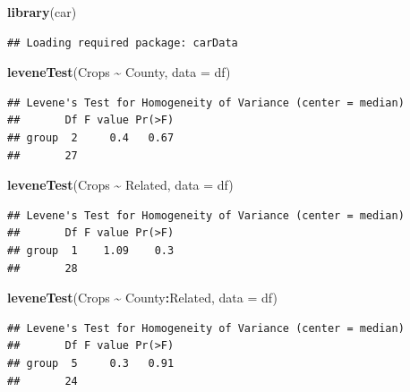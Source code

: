 \documentclass[
]{article}
\newenvironment{Shaded}{\begin{snugshade}}{\end{snugshade}}
\newcommand{\AttributeTok}[1]{\textcolor[rgb]{0.13,0.29,0.53}{#1}}
\newcommand{\FunctionTok}[1]{\textcolor[rgb]{0.13,0.29,0.53}{\textbf{#1}}}
\newcommand{\NormalTok}[1]{#1}
\newcommand{\SpecialCharTok}[1]{\textcolor[rgb]{0.81,0.36,0.00}{\textbf{#1}}}
\begin{document}
\begin{Shaded}
\begin{Highlighting}[]
\FunctionTok{library}\NormalTok{(car)}
\end{Highlighting}
\end{Shaded}

\begin{verbatim}
## Loading required package: carData
\end{verbatim}

\begin{Shaded}
\begin{Highlighting}[]
\FunctionTok{leveneTest}\NormalTok{(Crops }\SpecialCharTok{\textasciitilde{}}\NormalTok{ County, }\AttributeTok{data =}\NormalTok{ df)}
\end{Highlighting}
\end{Shaded}

\begin{verbatim}
## Levene's Test for Homogeneity of Variance (center = median)
##       Df F value Pr(>F)
## group  2     0.4   0.67
##       27
\end{verbatim}

\begin{Shaded}
\begin{Highlighting}[]
\FunctionTok{leveneTest}\NormalTok{(Crops }\SpecialCharTok{\textasciitilde{}}\NormalTok{ Related, }\AttributeTok{data =}\NormalTok{ df)}
\end{Highlighting}
\end{Shaded}

\begin{verbatim}
## Levene's Test for Homogeneity of Variance (center = median)
##       Df F value Pr(>F)
## group  1    1.09    0.3
##       28
\end{verbatim}

\begin{Shaded}
\begin{Highlighting}[]
\FunctionTok{leveneTest}\NormalTok{(Crops }\SpecialCharTok{\textasciitilde{}}\NormalTok{ County}\SpecialCharTok{:}\NormalTok{Related, }\AttributeTok{data =}\NormalTok{ df)}
\end{Highlighting}
\end{Shaded}

\begin{verbatim}
## Levene's Test for Homogeneity of Variance (center = median)
##       Df F value Pr(>F)
## group  5     0.3   0.91
##       24
\end{verbatim}
\end{document}
